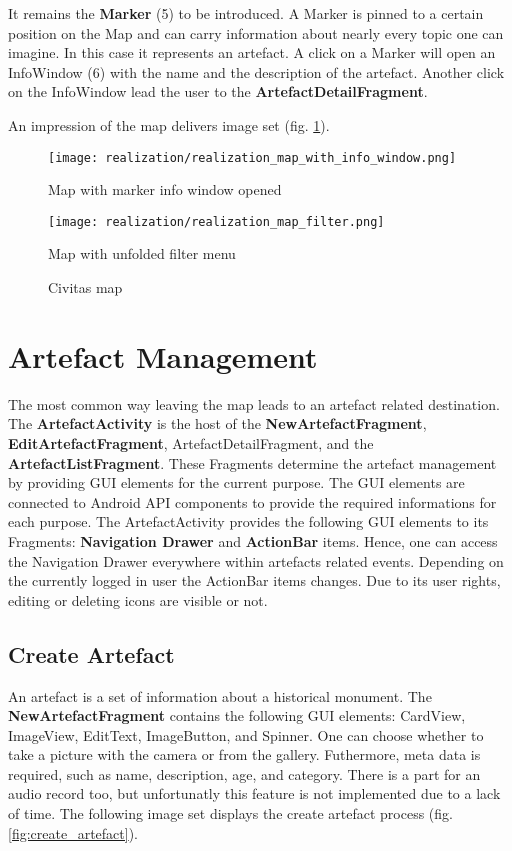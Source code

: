 It remains the \textbf{Marker} (5) to be introduced. A Marker is pinned to a certain position on the Map and can carry information about nearly every topic one can imagine. In this case it represents an artefact. A click on a Marker will open an InfoWindow (6) with the name and the description of the artefact. Another click on the InfoWindow lead the user to the \textbf{ArtefactDetailFragment}.

An impression of the map delivers image set (fig. \ref{fig:civitas_map}).

\begin{figure}[!htb]
  \texttt{[image: realization/realization\_map\_with\_info\_window.png]}
  \caption{Map with marker info window opened}
  \label{fig:map_info_window}
\endminipage\hfill
{}
  \texttt{[image: realization/realization\_map\_filter.png]}
  \caption{Map with unfolded filter menu}
  \label{fig:map_filter}
\endminipage\hfill
\caption{Civitas map}
\label{fig:civitas_map}
\end{figure}


\section{Artefact Management}
The most common way leaving the map leads to an artefact related destination. The \textbf{ArtefactActivity} is the host of the \textbf{NewArtefactFragment}, \textbf{EditArtefactFragment}, ArtefactDetailFragment, and the \textbf{ArtefactListFragment}. These Fragments determine the artefact management by providing GUI elements for the current purpose. The GUI elements are connected to Android API components to provide the required informations for each purpose. The ArtefactActivity provides the following GUI elements to its Fragments: \textbf{Navigation Drawer} and \textbf{ActionBar} items. Hence, one can access the Navigation Drawer everywhere within artefacts related events. Depending on the currently logged in user the ActionBar items changes. Due to its user rights, editing or deleting icons are visible or not.

\subsection{Create Artefact}
An artefact is a set of information about a historical monument. The \textbf{NewArtefactFragment} contains the following GUI elements: CardView, ImageView, EditText, ImageButton, and Spinner. 
One can choose whether to take a picture with the camera or from the gallery. Futhermore, meta data is required, such as name, description, age, and category. There is a part for an audio record too, but unfortunatly this feature is not implemented due to a lack of time.
The following image set displays the create artefact process (fig. \ref{fig:create_artefact}).


